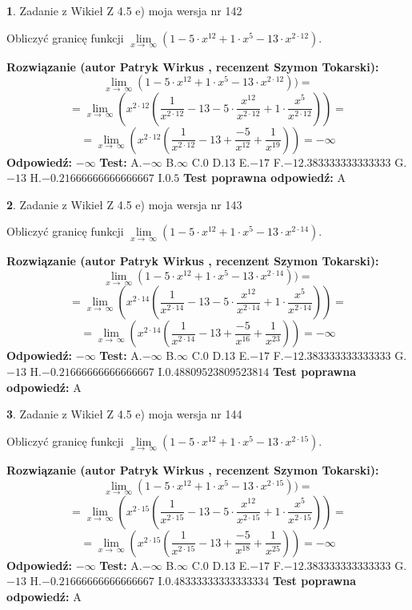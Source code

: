 \documentclass[12pt, a4paper]{article}
\theoremstyle{definition} %
\newtheorem{zad}{}
\newcommand{\zadStart}[1]{\begin{zad}#1\newline}
\newcommand{\zadStop}{\end{zad}}
\newcommand{\rozwStart}[2]{\noindent \textbf{Rozwiązanie (autor #1 , recenzent #2): }\newline}
\newcommand{\rozwStop}{\newline}
\newcommand{\odpStart}{\noindent \textbf{Odpowiedź:}\newline}
\newcommand{\odpStop}{\newline}
\newcommand{\testStart}{\noindent \textbf{Test:}\newline}
\newcommand{\testStop}{\newline}
\newcommand{\kluczStart}{\noindent \textbf{Test poprawna odpowiedź:}\newline}
\newcommand{\kluczStop}{\newline}
\begin{document}
\zadStart{Zadanie z Wikieł Z 4.5 e) moja wersja nr 142}


Obliczyć granicę funkcji  $\lim\limits_{x\to\ \infty}(1 - 5 \cdot x^{12}+1 \cdot x^{5}- 13 \cdot x^{2\cdot12})$.
\zadStop
\rozwStart{Patryk Wirkus}{Szymon Tokarski}
$$\lim\limits_{x\to\ \infty}(1 - 5 \cdot x^{12}+1 \cdot x^{5}- 13 \cdot x^{2\cdot12}))=$$
$$=\lim\limits_{x\to\ \infty}(x^{2\cdot12}(\frac{1}{x^{2\cdot12}}-13 -5 \cdot \frac{x^{12}}{x^{2\cdot12}}+1 \cdot \frac{x^{5}}{x^{2\cdot12}}))=$$
$$=\lim\limits_{x\to\ \infty}(x^{2\cdot12}(\frac{1}{x^{2\cdot12}}-13 + \frac{-5}{x^{12}}+ \frac{1}{x^{19}}))=-\infty$$
\rozwStop
\odpStart
$-\infty$
\odpStop
\testStart
A.$-\infty$ B.$\infty$ C.$0$ D.$13$ E.$-17$
F.$-12.383333333333333$ G.$-13$
H.$-0.21666666666666667$
I.$0.5$
\testStop
\kluczStart
A
\kluczStop



\zadStart{Zadanie z Wikieł Z 4.5 e) moja wersja nr 143}


Obliczyć granicę funkcji  $\lim\limits_{x\to\ \infty}(1 - 5 \cdot x^{12}+1 \cdot x^{5}- 13 \cdot x^{2\cdot14})$.
\zadStop
\rozwStart{Patryk Wirkus}{Szymon Tokarski}
$$\lim\limits_{x\to\ \infty}(1 - 5 \cdot x^{12}+1 \cdot x^{5}- 13 \cdot x^{2\cdot14}))=$$
$$=\lim\limits_{x\to\ \infty}(x^{2\cdot14}(\frac{1}{x^{2\cdot14}}-13 -5 \cdot \frac{x^{12}}{x^{2\cdot14}}+1 \cdot \frac{x^{5}}{x^{2\cdot14}}))=$$
$$=\lim\limits_{x\to\ \infty}(x^{2\cdot14}(\frac{1}{x^{2\cdot14}}-13 + \frac{-5}{x^{16}}+ \frac{1}{x^{23}}))=-\infty$$
\rozwStop
\odpStart
$-\infty$
\odpStop
\testStart
A.$-\infty$ B.$\infty$ C.$0$ D.$13$ E.$-17$
F.$-12.383333333333333$ G.$-13$
H.$-0.21666666666666667$
I.$0.48809523809523814$
\testStop
\kluczStart
A
\kluczStop



\zadStart{Zadanie z Wikieł Z 4.5 e) moja wersja nr 144}


Obliczyć granicę funkcji  $\lim\limits_{x\to\ \infty}(1 - 5 \cdot x^{12}+1 \cdot x^{5}- 13 \cdot x^{2\cdot15})$.
\zadStop
\rozwStart{Patryk Wirkus}{Szymon Tokarski}
$$\lim\limits_{x\to\ \infty}(1 - 5 \cdot x^{12}+1 \cdot x^{5}- 13 \cdot x^{2\cdot15}))=$$
$$=\lim\limits_{x\to\ \infty}(x^{2\cdot15}(\frac{1}{x^{2\cdot15}}-13 -5 \cdot \frac{x^{12}}{x^{2\cdot15}}+1 \cdot \frac{x^{5}}{x^{2\cdot15}}))=$$
$$=\lim\limits_{x\to\ \infty}(x^{2\cdot15}(\frac{1}{x^{2\cdot15}}-13 + \frac{-5}{x^{18}}+ \frac{1}{x^{25}}))=-\infty$$
\rozwStop
\odpStart
$-\infty$
\odpStop
\testStart
A.$-\infty$ B.$\infty$ C.$0$ D.$13$ E.$-17$
F.$-12.383333333333333$ G.$-13$
H.$-0.21666666666666667$
I.$0.48333333333333334$
\testStop
\kluczStart
A
\kluczStop
\end{document}
